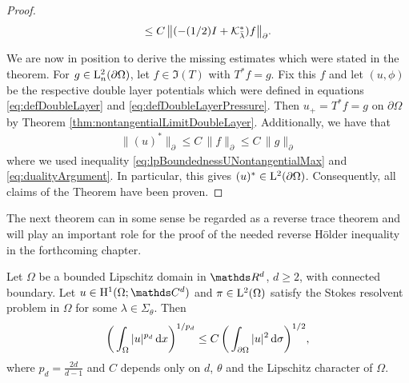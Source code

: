 \begin{proof}
\begin{align}
\begin{alignedat}{1}
    \leq C \, \big\|(-(1/2)I + \mathcal{K}_{\bar \lambda}^*)f \big\|_\partial^{}.
    \end{alignedat}
  \end{align}

  We are now in position to derive the missing estimates which were stated in the theorem.
  For $g \in \mathrm{L}^2_n(\partial\Omega)$, let $f \in \Im(T)$ with $T^* f = g$.
  Fix this $f$ and let $(u,\phi)$ be the respective double layer potentials which were defined in equations \eqref{eq:defDoubleLayer} and \eqref{eq:defDoubleLayerPressure}.
  Then $u_+ = T^* f =  g$ on $\partial\Omega$ by Theorem \ref{thm:nontangentialLimitDoubleLayer}.
  Additionally, we have that
  \begin{align*}
    \|(u)^* \|_\partial^{} \leq C \, \|f\|_\partial^{} \leq C\, \| g\|_\partial^{}
  \end{align*}
  where we used inequality \eqref{eq:lpBoundednessUNontangentialMax} and \eqref{eq:dualityArgument}. In particular, this gives $(u)^* \in \mathrm{L}^2(\partial\Omega)$.
  Consequently, all claims of the Theorem have been proven.
\end{proof}

The next theorem can in some sense be regarded as a reverse trace theorem and will play an important role for the proof of the needed reverse Hölder inequality in the forthcoming chapter.

\begin{thm}
  \label{thm:reverseTrace}
  Let $\Omega$ be a bounded Lipschitz domain in $\R^d$, $d \geq 2$, with connected boundary.
  Let $u \in \HH^1(\Omega; \C^d)$ and $\pi \in \mathrm{L}^2(\Omega)$ satisfy the Stokes resolvent problem in $\Omega$ for some $\lambda \in \Sigma_\theta$.
  Then
  \begin{align}
    \label{eq:reverseTrace}
    \bigg( \int_\Omega |u|^{p_d} \, {\operatorname{d}\!{x}} \bigg)^{1/{p_d}} \leq C\, \bigg( \int_{\partial\Omega} |u|^2 \, {\operatorname{d}\!{\sigma}} \bigg)^{1/2},
  \end{align}
  where $p_d = \frac{2d}{d - 1}$ and $C$ depends only on $d$, $\theta$ and the Lipschitz character of $\Omega$.
\end{thm}

